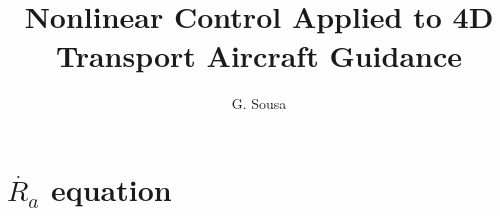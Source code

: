 \documentclass{ifacconf}
\begin{document}
\begin{frontmatter}

\title{Nonlinear Control Applied to 4D Transport Aircraft Guidance} 


\author[First]{G. Sousa} 

\address[First]{Instituto Superior Técnico, Lisbon, Portugal (guilherme.sousa@ist.utl.pt
).}



\end{frontmatter}








            

\appendix
 \section{$\dot{R_a}$ equation}
\label{sec:ra_dot}
\end{document}
